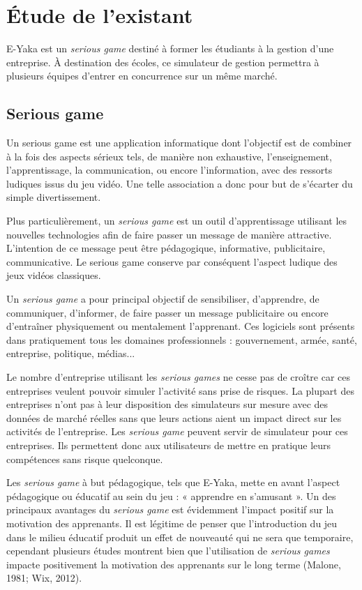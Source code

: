 \chapter{Étude de l’existant  }

    E-Yaka est un \emph{serious game} destiné à former les étudiants à la gestion d'une entreprise. À destination des écoles, ce simulateur de gestion permettra à plusieurs équipes d'entrer en concurrence sur un même marché.

    \section{Serious game}

        Un serious game est une application informatique dont l'objectif est de combiner à la fois des aspects sérieux tels, de manière non exhaustive, l'enseignement, l'apprentissage, la communication, ou encore l'information, avec des ressorts ludiques issus du jeu vidéo. Une telle association a donc pour but de s'écarter du simple divertissement.

        Plus particulièrement, un \emph{serious game} est un outil d’apprentissage utilisant les nouvelles technologies afin de faire passer un message de manière attractive. L’intention de ce message peut être pédagogique, informative, publicitaire, communicative. Le serious game conserve par conséquent l’aspect ludique des jeux vidéos classiques.

        Un \emph{serious game} a pour principal objectif de sensibiliser, d’apprendre, de communiquer, d’informer, de faire passer un message publicitaire ou encore d’entraîner physiquement ou mentalement l’apprenant. Ces logiciels sont présents dans pratiquement tous les domaines professionnels : gouvernement, armée, santé, entreprise, politique, médias...

        Le nombre d’entreprise utilisant les \emph{serious games} ne cesse pas de croître car ces entreprises veulent pouvoir simuler l’activité sans prise de risques. La plupart des entreprises n’ont pas à leur disposition des simulateurs sur mesure avec des données de marché réelles sans que leurs actions aient un impact direct sur les activités de l’entreprise. Les \emph{serious game} peuvent servir de simulateur pour ces entreprises. Ils permettent donc aux utilisateurs de mettre en pratique leurs compétences sans risque quelconque.

        Les \emph{serious game} à but pédagogique, tels que E-Yaka, mette en avant l’aspect pédagogique ou éducatif au sein du jeu : « apprendre en s’amusant ». Un des principaux avantages du \emph{serious game} est évidemment l’impact positif sur la motivation des apprenants. Il est légitime de penser que l’introduction du jeu dans le milieu éducatif produit un effet de nouveauté qui ne sera que temporaire, cependant plusieurs études montrent bien que l’utilisation de \emph{serious games} impacte positivement la motivation des apprenants sur le long terme (Malone, 1981; Wix, 2012).

